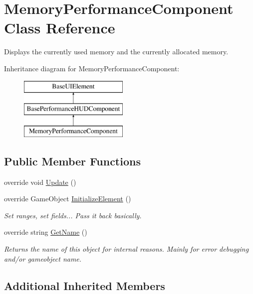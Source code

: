 \hypertarget{class_memory_performance_component}{}\section{Memory\+Performance\+Component Class Reference}
\label{class_memory_performance_component}


Displays the currently used memory and the currently allocated memory.  


Inheritance diagram for Memory\+Performance\+Component\+:\begin{figure}[H]
\begin{center}
\leavevmode
\includegraphics[height=3.000000cm]{class_memory_performance_component}
\end{center}
\end{figure}
\subsection*{Public Member Functions}
\begin{DoxyCompactItemize}
\item 
override void \hyperlink{class_memory_performance_component_a2eaccb31c5bb64588824bbccd2ec953b}{Update} ()
\item 
override Game\+Object \hyperlink{class_memory_performance_component_a8bc4c195f47ee32b0166c30d015d3db5}{Initialize\+Element} ()
\begin{DoxyCompactList}\small\item\em Set ranges, set fields... Pass it back basically. \end{DoxyCompactList}\item 
override string \hyperlink{class_memory_performance_component_a39185828d1f3fba8f1d10f56e11ac198}{Get\+Name} ()
\begin{DoxyCompactList}\small\item\em Returns the name of this object for internal reasons. Mainly for error debugging and/or gameobject name. \end{DoxyCompactList}\end{DoxyCompactItemize}
\subsection*{Additional Inherited Members}


